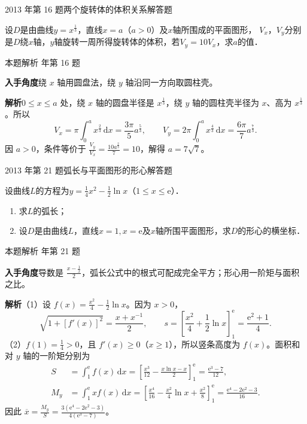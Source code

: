 \documentclass[UTF8,zihao=-4,fontset=fandol]{ctexart}
\newcommand{\QuestionPage}[6]{%
  \par\noindent\begin{minipage}{\linewidth}
  \raggedright
  {\small\textcolor{black!60}{#3\quad #5}\hfill\textcolor{accent}{#2}}\par\smallskip}
\newcommand{\QuestionEnd}{\end{minipage}\par\medskip}
\newcommand{\QuestionPage}[6]{%
  \clearpage
  {\small\textcolor{accent}{#1\hfill #2}}\par\medskip
  {\small\textcolor{black!60}{#3\quad #5\hfill #6}}\par\vspace{9bp}}
\newcommand{\QuestionEnd}{}
\newenvironment{QuestionSolution}[1]{%
  \clearpage
  {\small\textcolor{black!60}{本题解析\quad #1}}\par\medskip
}{\par\clearpage}
\begin{document}
\QuestionPage{3.4 定积分的应用}{解答题}{2013 年第 16 题}{2}{两个旋转体的体积关系}{178 / 234}
设$D$是由曲线$y = x^{\frac{1}{3}}$，直线$x = a$（$a > 0$）及$x$轴所围成的平面图形，
$V_x$，$V_y$分别是$D$绕$x$轴，$y$轴旋转一周所得旋转体的体积，若$V_y = 10V_x$，求$a$的值．
\QuestionEnd

\begin{QuestionSolution}{2013 年第 16 题}
\textbf{入手角度}\quad 绕 \(x\) 轴用圆盘法，绕 \(y\) 轴沿同一方向取圆柱壳。

\textbf{解析}\quad \(0\le x\le a\) 处，绕 \(x\) 轴的圆盘半径是 \(x^{\frac{1}{3}}\)，绕 \(y\) 轴的圆柱壳半径为 \(x\)、高为 \(x^{\frac{1}{3}}\)。所以
\[
V_x=\pi\int_0^a x^{\frac{2}{3}}\,\mathrm{d}x=\frac{3\pi}{5}a^{\frac{5}{3}},\qquad
V_y=2\pi\int_0^a x^{\frac{4}{3}}\,\mathrm{d}x=\frac{6\pi}{7}a^{\frac{7}{3}}.
\]
因 \(a>0\)，条件等价于 \(\frac{V_y}{V_x}=\frac{10a^{\frac{2}{3}}}{7}=10\)，解得 \(a=\boxed{7\sqrt7}\)。
\end{QuestionSolution}

\QuestionPage{3.4 定积分的应用}{解答题}{2013 年第 21 题}{4}{弧长与平面图形的形心}{179 / 234}
设曲线$L$的方程为$y = \frac{1}{4}x^2 - \frac{1}{2}\ln x$（$1 \le x \le \mathrm{e}$）．
\begin{enumerate}
\item 求$L$的弧长；
\item 设$D$是由曲线$L$，直线$x = 1,x = \mathrm{e}$及$x$轴所围平面图形，求$D$的形心的横坐标．
\end{enumerate}
\QuestionEnd

\begin{QuestionSolution}{2013 年第 21 题}
\textbf{入手角度}\quad 导数是 \(\frac{x-\frac{1}{x}}{2}\)，弧长公式中的根式可配成完全平方；形心用一阶矩与面积之比。

\textbf{解析}\quad （1）设 \(f(x)=\frac{x^2}{4}-\tfrac12\ln x\)。因为 \(x>0\)，
\[
\sqrt{1+[f'(x)]^2}=\frac{x+x^{-1}}{2},
\qquad
s=\left[\frac{x^2}{4}+\frac12\ln x\right]_1^{\mathrm{e}}
=\boxed{\frac{\mathrm{e}^2+1}{4}}.
\]
（2）\(f(1)=\frac{1}{4}>0\)，且 \(f'(x)\ge0\)（\(x\ge1\)），所以竖条高度为 \(f(x)\)。面积和对 \(y\) 轴的一阶矩分别为
\[
\begin{aligned}
S&=\int_1^{\mathrm{e}} f(x)\,\mathrm{d}x
=\left[\frac{x^3}{12}-\frac{x\ln x-x}{2}\right]_1^{\mathrm{e}}
=\frac{\mathrm{e}^3-7}{12},\\
M_y&=\int_1^{\mathrm{e}} xf(x)\,\mathrm{d}x
=\left[\frac{x^4}{16}-\frac{x^2}{4}\ln x+\frac{x^2}{8}\right]_1^{\mathrm{e}}
=\frac{\mathrm{e}^4-2\mathrm{e}^2-3}{16}.
\end{aligned}
\]
因此 \(\overline{x}=\frac{M_y}{S}=\boxed{\frac{3(\mathrm{e}^4-2\mathrm{e}^2-3)}{4(\mathrm{e}^3-7)}}\)。
\end{QuestionSolution}
\end{document}
